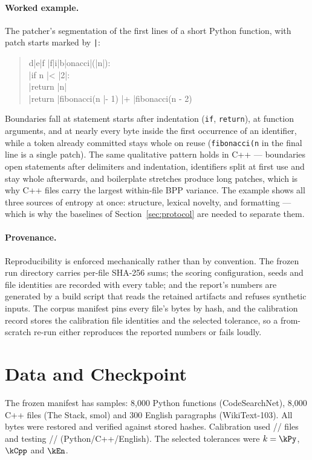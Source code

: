 \paragraph{Worked example.} The patcher's segmentation of the first lines of a short Python function, with patch starts marked by \texttt{|}:

\begin{quote}\small\ttfamily
d|e|f |f|i|b|onacci|(|n|):\\
\quad|if n |< |2|:\\
\quad\quad|return |n|\\
\quad|return |fibonacci(n |- 1) |+ |fibonacci(n - 2)
\end{quote}

Boundaries fall at statement starts after indentation (\texttt{if}, \texttt{return}), at function arguments, and at nearly every byte inside the first occurrence of an identifier, while a token already committed stays whole on reuse (\texttt{fibonacci(n} in the final line is a single patch). The same qualitative pattern holds in C++ --- boundaries open statements after delimiters and indentation, identifiers split at first use and stay whole afterwards, and boilerplate stretches produce long patches, which is why C++ files carry the largest within-file BPP variance. The example shows all three sources of entropy at once: structure, lexical novelty, and formatting --- which is why the baselines of Section~\ref{sec:protocol} are needed to separate them.

\paragraph{Provenance.} Reproducibility is enforced mechanically rather than by convention. The frozen run directory carries per-file SHA-256 sums; the scoring configuration, seeds and file identities are recorded with every table; and the report's numbers are generated by a build script that reads the retained artifacts and refuses synthetic inputs. The corpus manifest pins every file's bytes by hash, and the calibration record stores the calibration file identities and the selected tolerance, so a from-scratch re-run either reproduces the reported numbers or fails loudly.

\section{Data and Checkpoint}
The frozen manifest has \nSamples{} samples: 8{,}000 Python functions (CodeSearchNet), 8{,}000 C++ files (The Stack, smol) and 300 English paragraphs (WikiText-103). All bytes were restored and verified against stored hashes. Calibration used \nCalPy{}/\nCalCpp{}/\nCalEn{} files and testing \nTestPy{}/\nTestCpp{}/\nTestEn{} (Python/C++/English). The selected tolerances were $k=\kPy$, $\kCpp$ and $\kEn$.

